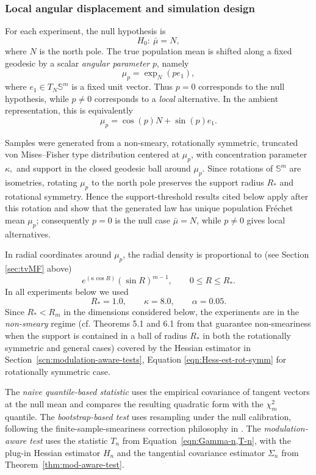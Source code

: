 \documentclass{amsart}
\theoremstyle{definition}
\theoremstyle{remark}
\newcommand\0{\boldsymbol{0}}
\begin{document}
\subsubsection{Local angular displacement and simulation design}
\label{subsec:numerical-design}

For each experiment, the null hypothesis is
\[
H_0:\ \bar\mu=N,
\]
where \(N\) is the north pole. The true population mean is shifted along a fixed geodesic by a scalar\textit{ angular parameter} \(p\), namely
\[
\mu_p=\exp_N(p e_1),
\]
where \(e_1\in T_N\mathbb S^m\) is a fixed unit vector. Thus \(p=0\) corresponds to the null hypothesis, while \(p\neq 0\) corresponds to a \textit{local} alternative. In the ambient representation, this is equivalently
\[
\mu_p=\cos(p)N+\sin(p)e_1.
\]

Samples were generated from a non-smeary, rotationally symmetric, truncated von Mises--Fisher type distribution centered at \(\mu_p\), with concentration parameter $\kappa,$ and support in the closed geodesic ball around \(\mu_p\). Since rotations of \(\mathbb S^m\) are isometries, rotating \(\mu_p\) to the north pole preserves the support radius \(R_\ast\) and rotational symmetry. Hence the support-threshold results cited below apply after this rotation and show that the generated law has unique population Fréchet mean \(\mu_p\); consequently \(p=0\) is the null case \(\bar\mu=N\), while \(p\ne0\) gives local alternatives.


In radial coordinates around \(\mu_p\), the radial density is proportional to (see Section \ref{sec:tvMF} above)
\[
e^{(\kappa\cos R)}(\sin R)^{m-1},
\qquad 0\le R\le R_\ast.
\]
In all experiments below we used
$$
R_\ast=1.0,\qquad \kappa=8.0,\qquad \alpha=0.05.
$$
Since \(R_\ast<R_m\) in the dimensions considered below, the experiments are in the \textit{non-smeary} regime (cf. Theorems 5.1 and 6.1 from \citet{Pal2026SharpSupportThresholds} that guarantee non-smeariness when the support is contained in a ball of radius $R_\ast$ in both the rotationally symmetric and general cases) covered by the Hessian estimator in Section~\ref{scn:modulation-aware-tests}, Equation \eqref{eqn:Hess-est-rot-symm} for rotationally symmetric case.

The \textit{naive quantile-based statistic} uses the empirical covariance of tangent vectors at the null mean and compares the resulting quadratic form with the \(\chi^2_m\) quantile. The \textit{bootstrap-based test} uses resampling under the null calibration, following the finite-sample-smeariness correction philosophy in \cite{EltznerFSSonspheres,HH2}. The \textit{modulation-aware test} uses the statistic \(T_n\) from Equation~\eqref{eqn:Gamma-n,T-n}, with the plug-in Hessian estimator \(H_n\) and the tangential covariance estimator \(\Sigma_n\) from Theorem~\ref{thm:mod-aware-test}.
\end{document}
